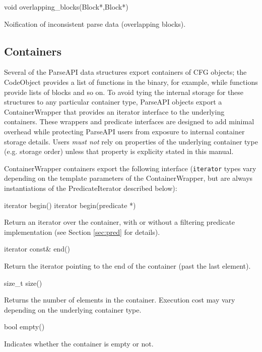 \documentclass{article}
\newenvironment{apient}{\small\verbatim}{\endverbatim}
\newcommand{\apidesc}[1]{%
{\addtolength{\leftskip}{4em}%
#1\par\medskip}
}
\begin{document}
\begin{apient}
void overlapping_blocks(Block*,Block*)
\end{apient}
\apidesc{Noification of inconsistent parse data (overlapping blocks).}

\subsection{Containers}
\label{sec:containers}

Several of the ParseAPI data structures export containers of CFG objects; the
CodeObject provides a list of functions in the binary, for example, while
functions provide lists of blocks and so on. To avoid tying the internal
storage for these structures to any particular container type, ParseAPI objects
export a ContainerWrapper that provides an iterator interface to the underlying
containers. These wrappers and predicate interfaces are designed to add minimal
overhead while protecting ParseAPI users from exposure to internal container
storage details. Users \emph{must not} rely on properties of the underlying
container type (e.g. storage order) unless that property is explicity stated in
this manual.

\noindent
ContainerWrapper containers export the following interface (\texttt{iterator} types vary depending on the template parameters of the ContainerWrapper, but are always instantiations of the PredicateIterator described below):

\begin{apient}
iterator begin()
iterator begin(predicate *)
\end{apient}
\apidesc{Return an iterator over the container, with or without a filtering predicate implementation (see Section \ref{sec:pred} for details).}

\begin{apient}
iterator const& end()
\end{apient}
\apidesc{Return the iterator pointing to the end of the container (past the last element).}

\begin{apient}
size_t size()
\end{apient}
\apidesc{Returns the number of elements in the container. Execution cost may vary depending on the underlying container type.}

\begin{apient}
bool empty()
\end{apient}
\apidesc{Indicates whether the container is empty or not.}
\end{document}
